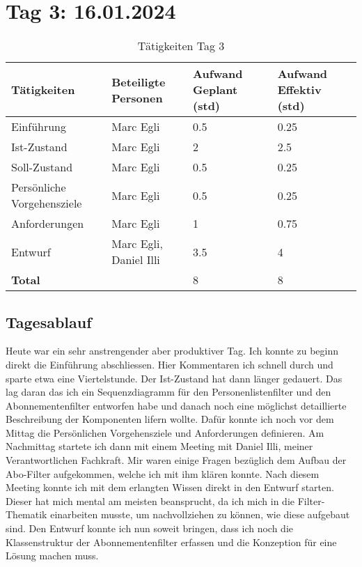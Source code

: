 \section{Tag 3: 16.01.2024}
\begin{table}[H]
    \begin{tabular}{|L{0.4\textwidth}|C{60pt}|C{60pt}|C{60pt}|}
        \hline
        \color{white}Tätigkeiten & \color{white}Beteiligte \color{white}Personen & \color{white}Aufwand Geplant (std) & \color{white}Aufwand Effektiv (std) \\
        \hline
        Einführung & Marc Egli & 0.5 & 0.25 \\
        \hline
        Ist-Zustand & Marc Egli & 2 & 2.5 \\
        \hline
        Soll-Zustand & Marc Egli & 0.5 & 0.25 \\
        \hline
        Persönliche Vorgehensziele & Marc Egli & 0.5 & 0.25 \\
        \hline
        Anforderungen & Marc Egli & 1 & 0.75 \\
        \hline
        Entwurf & Marc Egli, Daniel Illi & 3.5 & 4 \\
        \hline
        \textbf{Total} & & 8 & 8 \\
        \hline
    \end{tabular}
    \caption{Tätigkeiten Tag 3}
\end{table}

\subsection*{Tagesablauf}
Heute war ein sehr anstrengender aber produktiver Tag. Ich konnte zu beginn direkt die Einführung abschliessen. Hier Kommentaren
ich schnell durch und sparte etwa eine Viertelstunde. Der Ist-Zustand hat dann länger gedauert. Das lag daran das ich ein Sequenzdiagramm
für den Personenlistenfilter und den Abonnementenfilter entworfen habe und danach noch eine möglichst detaillierte Beschreibung der Komponenten lifern wollte.
Dafür konnte ich noch vor dem Mittag die Persönlichen Vorgehensziele und Anforderungen definieren. Am Nachmittag startete ich dann mit einem
Meeting mit Daniel Illi, meiner Verantwortlichen Fachkraft. Mir waren einige Fragen bezüglich dem Aufbau der Abo-Filter aufgekommen, welche ich mit ihm
klären konnte. Nach diesem Meeting konnte ich mit dem erlangten Wissen direkt in den Entwurf starten. Dieser hat mich mental am meisten beansprucht, da ich mich 
in die Filter-Thematik einarbeiten musste, um nachvollziehen zu können, wie diese aufgebaut sind. Den Entwurf konnte ich nun soweit bringen,
dass ich noch die Klassenstruktur der Abonnementenfilter erfassen und die Konzeption für eine Lösung machen muss.



